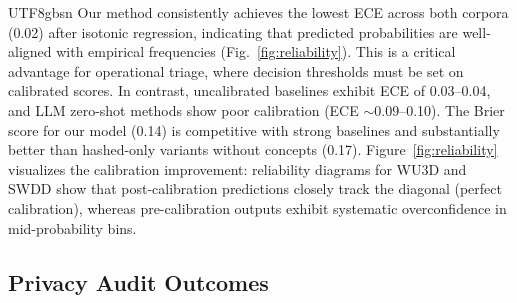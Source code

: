 \documentclass[lettersize,journal]{IEEEtran}
\begin{document}
\begin{CJK*}{UTF8}{gbsn}
Our method consistently achieves the lowest ECE across both corpora (0.02) after isotonic regression, indicating that predicted probabilities are well-aligned with empirical frequencies (Fig.~\ref{fig:reliability}). This is a critical advantage for operational triage, where decision thresholds must be set on calibrated scores. In contrast, uncalibrated baselines exhibit ECE of 0.03--0.04, and LLM zero-shot methods show poor calibration (ECE ${\sim}$0.09--0.10). The Brier score for our model (0.14) is competitive with strong baselines and substantially better than hashed-only variants without concepts (0.17). Figure~\ref{fig:reliability} visualizes the calibration improvement: reliability diagrams for WU3D and SWDD show that post-calibration predictions closely track the diagonal (perfect calibration), whereas pre-calibration outputs exhibit systematic overconfidence in mid-probability bins.

\subsection{Privacy Audit Outcomes}
\label{sec:results:privacy}


\end{CJK*}
\end{document}
